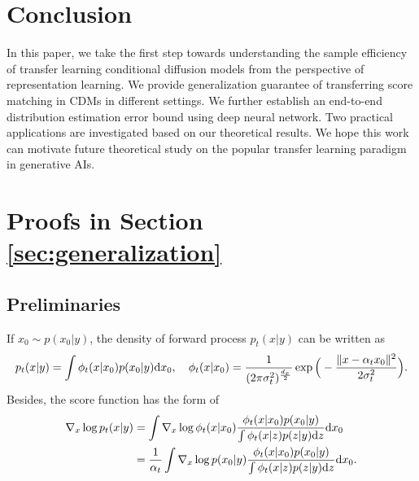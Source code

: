 \documentclass[11pt]{article}
\numberwithin{equation}{section}
\begin{document}
\section{Conclusion}

In this paper, we take the first step towards understanding the sample efficiency of transfer learning conditional diffusion models from the perspective of representation learning.
We provide generalization guarantee of transferring score matching in CDMs in different settings.
We further establish an end-to-end distribution estimation error bound using deep neural network.
Two practical applications are investigated based on our theoretical results.
We hope this work can motivate future theoretical study on the popular transfer learning paradigm in generative AIs.




\newpage

\appendix


\section{Proofs in Section \ref{sec:generalization}}

\subsection{Preliminaries}\label{app:subsec:pre_generalization}

\begin{lemma}
    If $x_0\sim p(x_0|y)$, the density of forward process $p_t(x|y)$ can be written as
    \begin{equation}\label{eq:density}
        p_t(x|y)=\int \phi_t(x|x_0)p(x_0|y)\mathrm{d} x_0,\quad  \phi_t(x|x_0)=\frac{1}{(2\pi\sigma_t^2)^{\frac{d_x}{2}}}\exp\Big(-\frac{\|x-\alpha_tx_0\|^2}{2\sigma_t^2}\Big).
    \end{equation}
    Besides, the score function has the form of
    \begin{align}
        \nabla_x\log p_t(x|y)
        &=\int \nabla_x\log\phi_t(x|x_0)\frac{\phi_t(x|x_0)p(x_0|y)}{\int \phi_t(x|z)p(z|y)\mathrm{d} z}\mathrm{d} x_0 \label{eq:score_1}\\
        &=\frac{1}{\alpha_t}\int \nabla_x\log p(x_0|y)\frac{\phi_t(x|x_0)p(x_0|y)}{\int \phi_t(x|z)p(z|y)\mathrm{d} z}\mathrm{d} x_0. \label{eq:score_2}
    \end{align}
\end{lemma}
\end{document}
